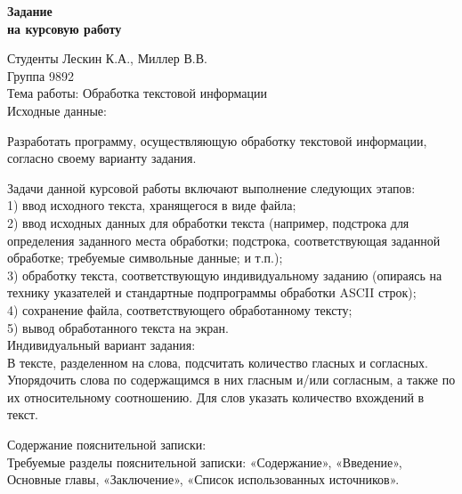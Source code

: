 \documentclass[12pt,a4paper]{article}  %
\begin{document}
\begin{center}
	\Large{
		\textbf{Задание\\ на курсовую работу}
	}
\end{center}

Студенты Лескин К.А., Миллер В.В.\\

Группа 9892\\

Тема работы: Обработка текстовой информации\\

Исходные данные:

Разработать программу, осуществляющую обработку текстовой информации, согласно своему варианту задания.

Задачи данной курсовой работы включают выполнение следующих
этапов:\\
1) ввод исходного текста, хранящегося в виде файла;\\
2) ввод исходных данных для обработки текста (например, подстрока для
определения заданного места обработки; подстрока, соответствующая
заданной обработке; требуемые символьные данные; и т.п.);\\
3) обработку
текста,
соответствующую
индивидуальному
заданию
(опираясь на технику указателей и стандартные подпрограммы обработки
ASCII строк);\\
4) сохранение файла, соответствующего обработанному тексту;\\
5) вывод обработанного текста на экран.\\

Индивидуальный вариант задания:\\
В тексте, разделенном на слова, подсчитать количество
гласных и согласных. Упорядочить слова по содержащимся в них гласным
и/или согласным, а также по их относительному соотношению. Для слов
указать количество вхождений в текст.

\newpage

Содержание пояснительной записки:\\
Требуемые разделы пояснительной записки: «Содержание», «Введение», Основные главы,
«Заключение», «Список использованных источников».\\
\end{document}
